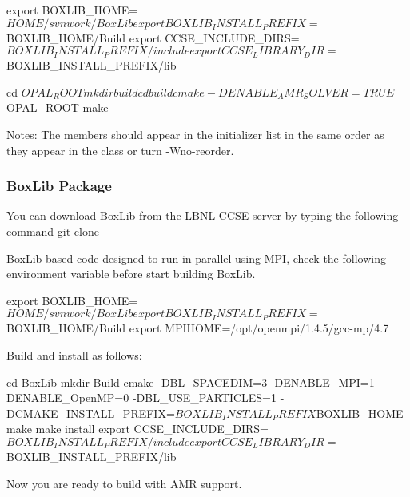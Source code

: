 \begin{footnotesize}
\begin{example}
export BOXLIB_HOME=$HOME/svnwork/BoxLib
export BOXLIB_INSTALL_PREFIX=$BOXLIB_HOME/Build
export CCSE_INCLUDE_DIRS=$BOXLIB_INSTALL_PREFIX/include
export CCSE_LIBRARY_DIR=$BOXLIB_INSTALL_PREFIX/lib
\end{example}
 \label{ssec:envvar_AMR}
\end{footnotesize}


\begin{footnotesize}
\begin{example}
cd $OPAL_ROOT
mkdir build
cd build
cmake -DENABLE_AMR_SOLVER=TRUE $OPAL_ROOT
make
\end{example}
\end{footnotesize}

Notes:
The members should appear in the initializer list in the same order as they
appear in the class or turn -Wno-reorder.


\subsubsection{BoxLib Package}
\label{ssubsection:BoxLibBuild}

You can download BoxLib from the LBNL CCSE server by typing the following command {\rm git clone}
\begin{footnotesize}
\end{footnotesize}

BoxLib based code designed to run in parallel using MPI, check the following environment variable
before start building BoxLib.
\begin{example}
export BOXLIB_HOME=$HOME/svnwork/BoxLib
export BOXLIB_INSTALL_PREFIX=$BOXLIB_HOME/Build
export MPIHOME=/opt/openmpi/1.4.5/gcc-mp/4.7
\end{example}

Build and install as follows:
\begin{footnotesize}
\begin{example}
cd BoxLib
mkdir Build
cmake -DBL_SPACEDIM=3 -DENABLE_MPI=1 -DENABLE_OpenMP=0 -DBL_USE_PARTICLES=1
            -DCMAKE_INSTALL_PREFIX=$BOXLIB_INSTALL_PREFIX $BOXLIB_HOME
make
make install
export CCSE_INCLUDE_DIRS=$BOXLIB_INSTALL_PREFIX/include
export CCSE_LIBRARY_DIR=$BOXLIB_INSTALL_PREFIX/lib
\end{example}
\end{footnotesize}
Now you are ready to build \opal with AMR support.

